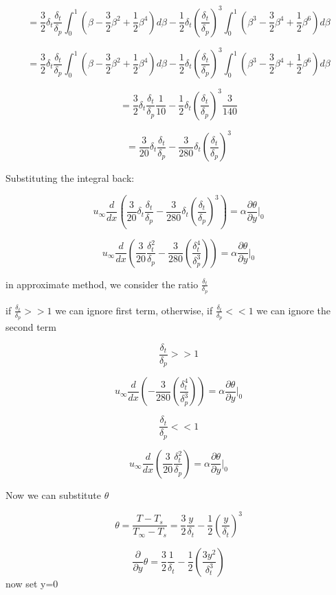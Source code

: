 \documentclass[11pt]{article}
\begin{document}
$$=  \frac{3}{2} \delta_t \frac{\delta_t}{\delta_p}  \int_{0}^{1}    (\beta-\frac{3}{2} \beta^2 + \frac{1}{2} \beta^4) d \beta  - \frac{1}{2} \delta_t (\frac{ \delta_t}{\delta_p})^3 \int_{0}^{1}  (\beta^3-\frac{3}{2} \beta^4 + \frac{1}{2} \beta^6) d \beta $$

$$=  \frac{3}{2} \delta_t \frac{\delta_t}{\delta_p}  \int_{0}^{1}    (\beta-\frac{3}{2} \beta^2 + \frac{1}{2} \beta^4) d \beta  - \frac{1}{2} \delta_t (\frac{ \delta_t}{\delta_p})^3 \int_{0}^{1}  (\beta^3-\frac{3}{2} \beta^4 + \frac{1}{2} \beta^6) d \beta $$

$$=  \frac{3}{2} \delta_t \frac{\delta_t}{\delta_p}  \frac{1}{10}  - \frac{1}{2} \delta_t (\frac{ \delta_t}{\delta_p})^3 \frac{3}{140} $$


$$=  \frac{3}{20} \delta_t \frac{\delta_t}{\delta_p}   - \frac{3}{280} \delta_t (\frac{ \delta_t}{\delta_p})^3 $$

Substituting the integral back:

$$ u_\infty \frac{d}{dx} \left(  \frac{3}{20} \delta_t \frac{\delta_t}{\delta_p}   - \frac{3}{280} \delta_t (\frac{ \delta_t}{\delta_p})^3 \right)  = \alpha \frac{\partial \theta}{\partial y} |_0 $$ 

$$ u_\infty \frac{d}{dx} \left(  \frac{3}{20} \frac{\delta_t^2}{\delta_p}   - \frac{3}{280} (\frac{ \delta_t^4}{\delta_p^3}) \right)  = \alpha \frac{\partial \theta}{\partial y} |_0 $$ 

in approximate method, we consider the ratio $\frac{\delta_t}{\delta_p}$


if $\frac{\delta_t}{\delta_p} >> 1$ we can ignore first term, otherwise, if $\frac{\delta_t}{\delta_p} << 1$ we can ignore the second term

$$\frac{\delta_t}{\delta_p} >> 1$$

$$ u_\infty \frac{d}{dx} \left(   - \frac{3}{280} (\frac{ \delta_t^4}{\delta_p^3}) \right)  = \alpha \frac{\partial \theta}{\partial y} |_0 $$ 

$$\frac{\delta_t}{\delta_p} << 1$$

$$ u_\infty \frac{d}{dx} \left(  \frac{3}{20} \frac{\delta_t^2}{\delta_p}   \right)  = \alpha \frac{\partial \theta}{\partial y} |_0 $$ 

Now we can substitute $\theta$

$$\theta = \frac{T-T_s}{T_\infty-T_s} = \frac{3}{2} \frac{y}{\delta_t} - \frac{1}{2} (\frac{y}{\delta_t})^3$$

$$ \frac{\partial }{\partial y}\theta = \frac{3}{2} \frac{1}{\delta_t} - \frac{1}{2} (\frac{3y^2}{\delta_t^3})$$
now set y=0
\end{document}

